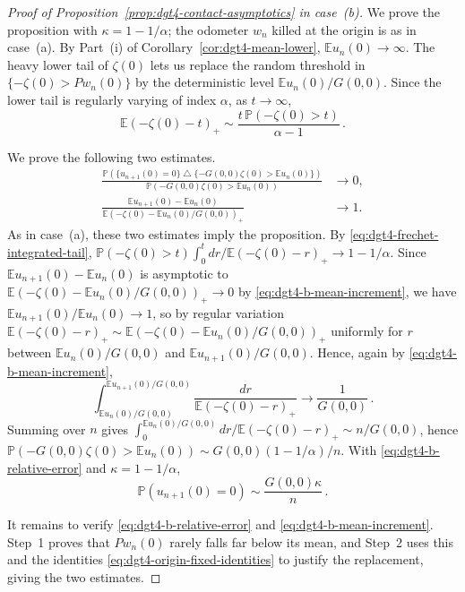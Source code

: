 \documentclass[11pt]{amsart}
\theoremstyle{plain}
\theoremstyle{definition}
\newcommand{\E}{\mathbb{E}}
\renewcommand{\P}{\mathbb{P}}
\begin{document}
\begin{proof}[Proof of Proposition~\ref{prop:dgt4-contact-asymptotics} in case~\textup{(b)}]
	We prove the proposition with $\kappa=1-1/\alpha$; the odometer $w_n$ killed at the
	origin is as in case~\textup{(a)}. By Part~\textup{(i)} of
	Corollary~\ref{cor:dgt4-mean-lower}, $\E u_n(0)\to\infty$. The heavy lower tail of
	$\zeta(0)$ lets us replace the random threshold in $\{-\zeta(0)>Pw_n(0)\}$ by the
	deterministic level $\E u_n(0)/G(0,0)$. Since the lower tail is regularly varying of
	index $\alpha$, as $t\to\infty$,
	\begin{equation}\label{eq:dgt4-frechet-integrated-tail}
		\E(-\zeta(0)-t)_+\sim\frac{t\,\P(-\zeta(0)>t)}{\alpha-1}\, .
	\end{equation}

	We prove the following two estimates.
	\begin{align}
	\frac{\P\left(
	\{u_{n+1}(0)=0\}\mathbin{\triangle}\{-G(0,0)\zeta(0)>\E u_n(0)\}
	\right)}{\P(-G(0,0)\zeta(0)>\E u_n(0))}
	&\longrightarrow0,
	\label{eq:dgt4-b-relative-error}\\
	\frac{\E u_{n+1}(0)-\E u_n(0)}{\E(-\zeta(0)-\E u_n(0)/G(0,0))_+}
	&\longrightarrow1.
	\label{eq:dgt4-b-mean-increment}
	\end{align}
	As in case~\textup{(a)}, these two estimates imply the proposition. By \eqref{eq:dgt4-frechet-integrated-tail}, $\P(-\zeta(0)>t)\int_0^t dr/\E(-\zeta(0)-r)_+\to1-1/\alpha$.
	Since $\E u_{n+1}(0)-\E u_n(0)$ is asymptotic to
	$\E(-\zeta(0)-\E u_n(0)/G(0,0))_+\to0$ by \eqref{eq:dgt4-b-mean-increment}, we have $\E u_{n+1}(0)/\E u_n(0)\to1$, so by regular
	variation $\E(-\zeta(0)-r)_+\sim\E(-\zeta(0)-\E u_n(0)/G(0,0))_+$ uniformly for $r$ between
	$\E u_n(0)/G(0,0)$ and $\E u_{n+1}(0)/G(0,0)$. Hence, again by
	\eqref{eq:dgt4-b-mean-increment},
	\[
		\int_{\E u_n(0)/G(0,0)}^{\E u_{n+1}(0)/G(0,0)}\frac{dr}{\E(-\zeta(0)-r)_+}\longrightarrow\frac1{G(0,0)}\, .
	\]
	Summing over $n$ gives $\int_0^{\E u_n(0)/G(0,0)}dr/\E(-\zeta(0)-r)_+\sim n/G(0,0)$, hence
	$\P(-G(0,0)\zeta(0)>\E u_n(0))\sim G(0,0)(1-1/\alpha)/n$. With
	\eqref{eq:dgt4-b-relative-error} and $\kappa=1-1/\alpha$,
	\[
		\P(u_{n+1}(0)=0)\sim\frac{G(0,0)\kappa}{n}\, .
	\]

	It remains to verify \eqref{eq:dgt4-b-relative-error} and
	\eqref{eq:dgt4-b-mean-increment}. Step~1 proves that $Pw_n(0)$ rarely falls far
	below its mean, and Step~2 uses this and the identities
	\eqref{eq:dgt4-origin-fixed-identities} to justify the replacement, giving the two
	estimates.


\end{proof}
\end{document}
